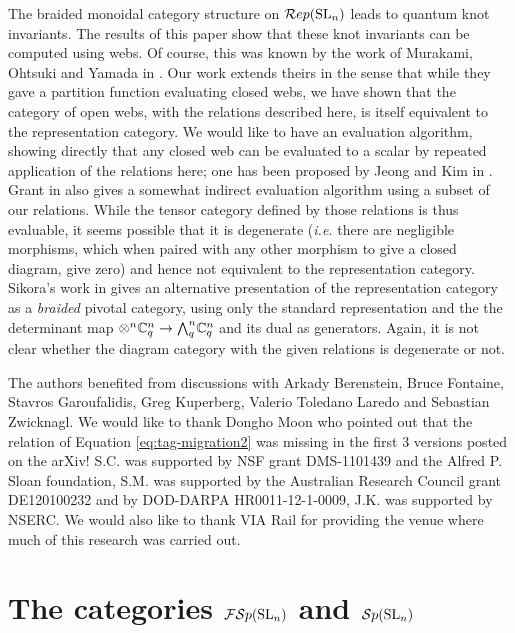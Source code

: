 \documentclass[11pt]{amsart}
\begin{document}
The braided monoidal category structure on $\mathcal{R}ep({\rm{SL}}_n) $ leads to quantum knot invariants.  The results of this paper show that these knot invariants can be computed using webs. Of course, this was known by the work of Murakami, Ohtsuki and Yamada in \cite{MR1659228}. Our work extends theirs in the sense that while they gave a partition function evaluating closed webs, we have shown that the category of open webs, with the relations described here, is itself equivalent to the representation category. We would like to have an evaluation algorithm, showing directly that any closed web can be evaluated to a scalar by repeated application of the relations here; one has been proposed by Jeong and Kim in \cite{math/0506403}. Grant in \cite{1212.4511} also gives a somewhat indirect evaluation algorithm using a subset of our relations. While the tensor category defined by those relations is thus evaluable, it seems possible that it is degenerate (\emph{i.e.} there are negligible morphisms, which when paired with any other morphism to give a closed diagram, give zero) and hence not equivalent to the representation category. Sikora's work in \cite{MR2171796} gives an alternative presentation of the representation category as a \emph{braided} pivotal category, using only the standard representation and the the determinant map $\otimes^n {\mathbb{C}}^n_q \to {\textstyle\bigwedge^{n}_{q}} {\mathbb{C}}^n_q$ and its dual as generators. Again, it is not clear whether the diagram category with the given relations is degenerate or not.

\vspace{.5cm}

The authors benefited from discussions with Arkady Berenstein, Bruce Fontaine, Stavros Garoufalidis, Greg Kuperberg, Valerio Toledano Laredo and Sebastian Zwicknagl. We would like to thank Dongho Moon who pointed out that the relation of Equation \eqref{eq:tag-migration2} was missing in the first 3 versions posted on the arXiv! S.C. was supported by NSF grant DMS-1101439 and the Alfred P. Sloan foundation, S.M. was supported by the Australian Research Council grant DE120100232 and by DOD-DARPA HR0011-12-1-0009, J.K. was supported by NSERC.  We would also like to thank VIA Rail for providing the venue where much of this research was carried out.

\section{The categories \texorpdfstring{${\mathcal{FS}p}({\rm{SL}}_n)$}{FSp(SL\_n)} and \texorpdfstring{${\mathcal{S}p}({\rm{SL}}_n)$}{Sp(SL\_n)}}\label{sec:diagrams}
\end{document}
